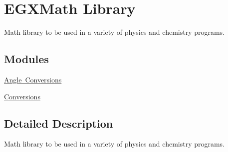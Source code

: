 \hypertarget{group___e_g_x_math}{}\section{E\+G\+X\+Math Library}
\label{group___e_g_x_math}


Math library to be used in a variety of physics and chemistry programs.  


\subsection*{Modules}
\begin{DoxyCompactItemize}
\item 
\mbox{\hyperlink{group___e_g_x_math-_angle_conversions}{Angle Conversions}}
\item 
\mbox{\hyperlink{group___e_g_x_math-_conversions}{Conversions}}
\end{DoxyCompactItemize}


\subsection{Detailed Description}
Math library to be used in a variety of physics and chemistry programs. 

